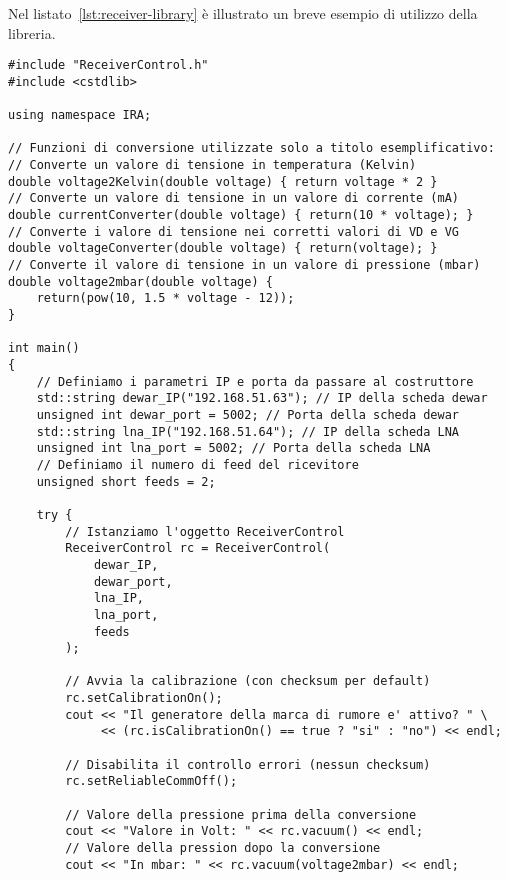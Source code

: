 Nel listato~\ref{lst:receiver-library} \`e illustrato un breve esempio di utilizzo della
libreria.
\lstset{language=C++}
\begin{lstlisting}[caption={[Esempio di utilizzo della libreria \texttt{ReceiverLibrary}]Esempio 
di utilizzo della libreria \texttt{ReceiverLibrary}},
label=lst:receiver-library,mathescape]
#include "ReceiverControl.h"
#include <cstdlib>

using namespace IRA;

// Funzioni di conversione utilizzate solo a titolo esemplificativo:
// Converte un valore di tensione in temperatura (Kelvin)
double voltage2Kelvin(double voltage) { return voltage * 2 }
// Converte un valore di tensione in un valore di corrente (mA)
double currentConverter(double voltage) { return(10 * voltage); }
// Converte i valore di tensione nei corretti valori di VD e VG
double voltageConverter(double voltage) { return(voltage); }
// Converte il valore di tensione in un valore di pressione (mbar)
double voltage2mbar(double voltage) { 
    return(pow(10, 1.5 * voltage - 12)); 
}

int main()
{
    // Definiamo i parametri IP e porta da passare al costruttore
    std::string dewar_IP("192.168.51.63"); // IP della scheda dewar
    unsigned int dewar_port = 5002; // Porta della scheda dewar
    std::string lna_IP("192.168.51.64"); // IP della scheda LNA
    unsigned int lna_port = 5002; // Porta della scheda LNA
    // Definiamo il numero di feed del ricevitore
    unsigned short feeds = 2; 

    try {
        // Istanziamo l'oggetto ReceiverControl
        ReceiverControl rc = ReceiverControl(
            dewar_IP, 
            dewar_port, 
            lna_IP, 
            lna_port, 
            feeds
        );
    
        // Avvia la calibrazione (con checksum per default)
        rc.setCalibrationOn();
        cout << "Il generatore della marca di rumore e' attivo? " \
             << (rc.isCalibrationOn() == true ? "si" : "no") << endl;

        // Disabilita il controllo errori (nessun checksum)
        rc.setReliableCommOff();

        // Valore della pressione prima della conversione
        cout << "Valore in Volt: " << rc.vacuum() << endl;
        // Valore della pression dopo la conversione
        cout << "In mbar: " << rc.vacuum(voltage2mbar) << endl;


\end{lstlisting}
